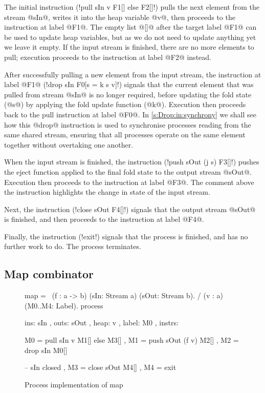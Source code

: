 The initial instruction (\lstiproc!pull sIn v F1[] else F2[]!) pulls the next element from the stream @sIn@, writes it into the heap variable @v@, then proceeds to the instruction at label @F1@.
The empty list @[]@ after the target label @F1@ can be used to update heap variables, but as we do not need to update anything yet we leave it empty. 
If the input stream is finished, there are no more elements to pull; execution proceeds to the instruction at label @F2@ instead.

After successfully pulling a new element from the input stream, the instruction at label @F1@ (\lstiproc!drop sIn F0[s = k s v]!) signals that the current element that was pulled from stream @sIn@ is no longer required, before updating the fold state (@s@) by applying the fold update function (@k@).
Execution then proceeds back to the pull instruction at label @F0@.
In \autoref{s:Drop:in:synchrony} we shall see how this @drop@ instruction is used to synchronise processes reading from the same shared stream, ensuring that all processes operate on the same element together without overtaking one another.

When the input stream is finished, the instruction (\lstiproc!push sOut (j s) F3[]!) pushes the eject function applied to the final fold state to the output stream @sOut@.
Execution then proceeds to the instruction at label @F3@.
The comment above the instruction highlights the change in state of the input stream.

Next, the instruction (\lstiproc!close sOut F4[]!) signals that the output stream @sOut@ is finished, and then proceeds to the instruction at label @F4@.

Finally, the instruction (\lstiproc!exit!) signals that the process is finished, and has no further work to do.
The process terminates.

\subsection{Map combinator}

\begin{figure}
\begin{process}
map 
  = \ (f  : a -> b)
      (sIn: Stream a) (sOut: Stream b). 
    / (v  : a)        (M0..M4: Label).
    process
     { ins:    { sIn  }
     , outs:   { sOut }
     , heap:   { v }
     , label:  M0
     , instrs: { M0 = pull  sIn     v  M1[] else M3[]
               , M1 = push  sOut (f v) M2[]
               , M2 = drop  sIn        M0[]

               -- sIn closed
               , M3 = close sOut       M4[]
               , M4 = exit } }
\end{process}
\caption{Process implementation of map}
\label{figs/procs/impl/map}
\end{figure}

